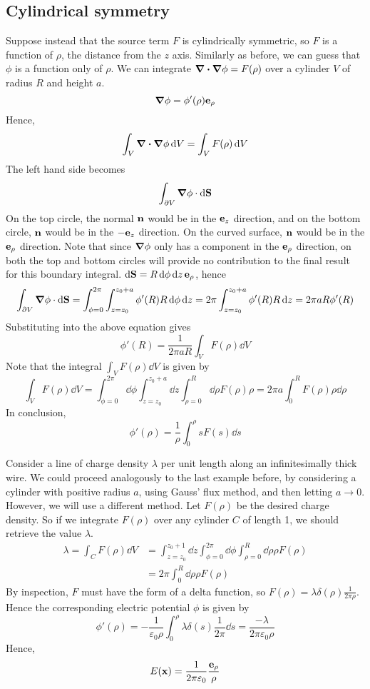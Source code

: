 \subsection{Cylindrical symmetry}
Suppose instead that the source term \(F\) is cylindrically symmetric, so \(F\) is a function of \(\rho\), the distance from the \(z\) axis.
Similarly as before, we can guess that \(\phi\) is a function only of \(\rho\).
We can integrate \(\div{\grad{\phi}} = F(\rho)\) over a cylinder \(V\) of radius \(R\) and height \(a\).
\[
	\grad{\phi} = \phi'(\rho) \vb e_\rho
\]
Hence,
\[
	\int_{V} \div{\grad{\phi}} \dd{V} = \int_{V} F(\rho) \dd{V}
\]
The left hand side becomes
\[
	\int_{\partial V} \grad\phi \cdot \dd{\vb S}
\]
On the top circle, the normal \(\vb n\) would be in the \(\vb e_z\) direction, and on the bottom circle, \(\vb n\) would be in the \(-\vb e_z\) direction.
On the curved surface, \(\vb n\) would be in the \(\vb e_\rho\) direction.
Note that since \(\grad\phi\) only has a component in the \(\vb e_\rho\) direction, on both the top and bottom circles will provide no contribution to the final result for this boundary integral.
\(\dd{\vb S} = R \dd{\phi} \dd{z} \vb e_\rho\), hence
\[
	\int_{\partial V} \grad\phi \cdot \dd{\vb S}
	= \int_{\phi = 0}^{2 \pi} \int_{z = z_0}^{z_0 + a} \phi'(R) R \dd{\phi} \dd{z}
	= 2\pi \int_{z = z_0}^{z_0 + a} \phi'(R) R \dd{z}
	= 2\pi a R \phi'(R)
\]
Substituting into the above equation gives
\[
	\phi'(R) = \frac{1}{2\pi a R} \int_{V} F(\rho) \dd{V}
\]
Note that the integral \(\int_{V} F(\rho) \dd{V}\) is given by
\[
	\int_{V} F(\rho) \dd{V} = \int_{\phi = 0}^{2 \pi} \dd{\phi} \int_{z = z_0}^{z_0 + a} \dd{z} \int_{\rho = 0}^R \dd{\rho} F(\rho) \rho = 2 \pi a \int_0^R F(\rho) \rho \dd{\rho}
\]
In conclusion,
\[
	\phi'(\rho) = \frac{1}{\rho} \int_0^\rho sF(s) \dd{s}
\]

\begin{example}
	Consider a line of charge density \(\lambda\) per unit length along an infinitesimally thick wire.
	We could proceed analogously to the last example before, by considering a cylinder with positive radius \(a\), using Gauss' flux method, and then letting \(a \to 0\).
	However, we will use a different method.
	Let \(F(\rho)\) be the desired charge density.
	So if we integrate \(F(\rho)\) over any cylinder \(C\) of length 1, we should retrieve the value \(\lambda\).
	\begin{align*}
		\lambda = \int_{C} F(\rho) \dd{V} & = \int_{z = z_0}^{z_0 + 1} \dd{z} \int_{\phi = 0}^{2 \pi} \dd{\phi} \int_{\rho = 0}^R \dd{\rho} \rho F(\rho) \\
										  & = 2 \pi \int_{0}^R \dd{\rho} \rho F(\rho)
	\end{align*}
	By inspection, \(F\) must have the form of a delta function, so \(F(\rho) = \lambda \delta(\rho) \frac{1}{2 \pi \rho}\).
	Hence the corresponding electric potential \(\phi\) is given by
	\[
		\phi'(\rho) = -\frac{1}{\varepsilon_0 \rho} \int_0^\rho \lambda \delta(s) \frac{1}{2 \pi} \dd{s} = \frac{-\lambda}{2\pi\varepsilon_0 \rho}
	\]
	Hence,
	\[
		E(\vb x) = \frac{1}{2 \pi \varepsilon_0} \frac{\vb e_\rho}{\rho}
	\]
\end{example}

